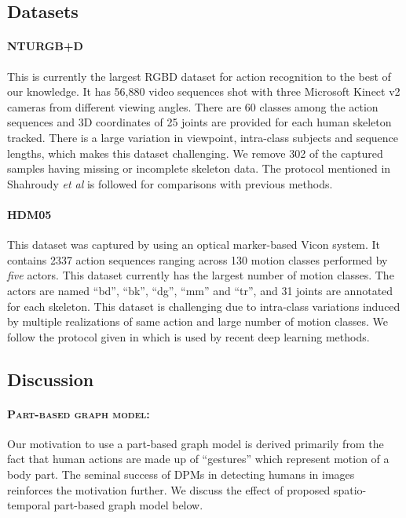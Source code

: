 \documentclass{bmvc2k}
\def\etal{\emph{et al}\bmvaOneDot}
\begin{document}
\subsection{Datasets}
\label{sec:5_1}
\paragraph{NTURGB+D}\cite{Shahroudy_2016_CVPR}
This is currently the largest RGBD dataset for action recognition to the best of our knowledge. It has 56,880 video sequences shot with three Microsoft Kinect v2 cameras from different viewing angles. There are 60 classes among the action sequences and 3D coordinates of 25 joints are provided for each human skeleton tracked. There is a large variation in viewpoint, intra-class subjects and sequence lengths, which makes this dataset challenging. We remove 302 of the captured samples having missing or incomplete skeleton data. The protocol mentioned in Shahroudy \etal \cite{Shahroudy_2016_CVPR} is followed for comparisons with previous methods.

\paragraph{HDM05}\cite{Muller07documentationmocap}
This dataset was captured by using an optical marker-based Vicon system. It contains 2337 action sequences ranging across 130 motion classes performed by \textit{five} actors. This dataset currently has the largest number of motion classes. The actors are named ``bd'', ``bk'', ``dg'', ``mm'' and ``tr'', and 31 joints are annotated for each skeleton. This dataset is challenging due to intra-class variations induced by multiple realizations of same action and large number of motion classes. We follow the protocol given in \cite{huang2017riemannian} which is used by recent deep learning methods.

\subsection{Discussion}
\label{sec:5_2}
\paragraph{\textsc{Part-based graph model}:} Our motivation to use a part-based graph model is derived primarily from the fact that human actions are made up of ``gestures'' which represent motion of a body part. The seminal success of DPMs \cite{Felzenszwalb:2005} in detecting humans in images reinforces the motivation further. We discuss the effect of proposed spatio-temporal part-based graph model below.
\end{document}

